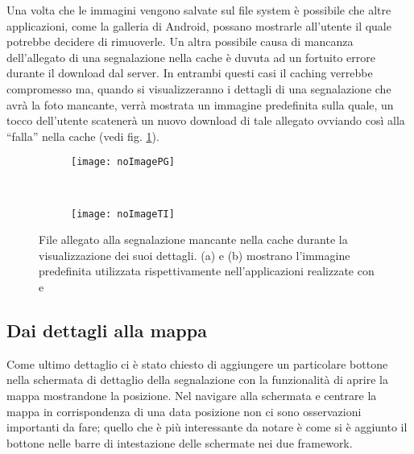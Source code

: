             Una volta che le immagini vengono salvate sul file system è
            possibile che altre applicazioni, come la galleria di Android,
            possano mostrarle all'utente il quale potrebbe decidere di
            rimuoverle. Un altra possibile causa di mancanza dell'allegato di
            una segnalazione nella cache è duvuta ad un fortuito errore durante
            il download dal server. In entrambi questi casi il caching verrebbe
            compromesso ma, quando si visualizzeranno i dettagli di una
            segnalazione che avrà la foto mancante, verrà mostrata un immagine
            predefinita sulla quale, un tocco dell'utente scatenerà un nuovo
            download di tale allegato ovviando così alla ``falla'' nella cache
            (vedi fig. \ref{fig:noImages}).
            \begin{figure}[h]
                \centering
                \begin{subfigure}[b]{0.485\textwidth}
                    \texttt{[image: noImagePG]}
                    \caption{}
                \end{subfigure}
                ~
                \begin{subfigure}[b]{0.485\textwidth}
                    \texttt{[image: noImageTI]}
                    \caption{}
                \end{subfigure}
                \caption{
                    File allegato alla segnalazione mancante nella cache durante
                    la visualizzazione dei suoi dettagli. (a) e (b) mostrano
                    l'immagine predefinita utilizzata rispettivamente
                    nell'applicazioni realizzate con \pg{} e \tisdk{}
                }
                \label{fig:noImages}
            \end{figure}

        
        \subsection{Dai dettagli alla mappa}
            Come ultimo dettaglio ci è stato chiesto di aggiungere un
            particolare bottone nella schermata di dettaglio della segnalazione
            con la funzionalità di aprire la mappa mostrandone la
            posizione. Nel navigare alla schermata e centrare la mappa in
            corrispondenza di una data posizione non ci sono osservazioni
            importanti da fare; quello che è più interessante da notare è come
            si è aggiunto il bottone nelle barre di intestazione delle schermate
            nei due framework.

